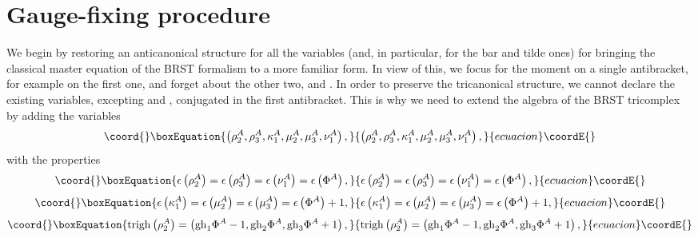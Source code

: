 \documentclass[a4paper,12pt]{article}
\begin{document}
\section{Gauge-fixing procedure}

We begin by restoring an anticanonical structure for all the variables (and,
in particular, for the bar and tilde ones) for bringing the classical master
equation of the BRST \coordHE{} formalism to a more familiar form. In view of
this, we focus for the moment on a single antibracket, for example on the
first one, and forget about the other two, \coordHE{} and \coordHE{}. In order to preserve the tricanonical structure, we
cannot declare the existing variables, excepting \coordHE{} and \coordHE{}, conjugated in the first antibracket. This is why we need to
extend the algebra of the BRST \coordHE{} tricomplex \coordHE{} by adding
the variables 
\begin{equation}\coord{}\boxEquation{
\left( \rho _{2}^{A},\rho _{3}^{A},\kappa _{1}^{A},\mu _{2}^{A},\mu
_{3}^{A},\nu _{1}^{A}\right) ,  \label{sp3.100a}
}{
\left( \rho _{2}^{A},\rho _{3}^{A},\kappa _{1}^{A},\mu _{2}^{A},\mu
_{3}^{A},\nu _{1}^{A}\right) ,  }{ecuacion}\coordE{}\end{equation}
with the properties 
\begin{equation}\coord{}\boxEquation{
\epsilon \left( \rho _{2}^{A}\right) =\epsilon \left( \rho _{3}^{A}\right)
=\epsilon \left( \nu _{1}^{A}\right) =\epsilon \left( \Phi ^{A}\right) ,
\label{sp3.100}
}{
\epsilon \left( \rho _{2}^{A}\right) =\epsilon \left( \rho _{3}^{A}\right)
=\epsilon \left( \nu _{1}^{A}\right) =\epsilon \left( \Phi ^{A}\right) ,
}{ecuacion}\coordE{}\end{equation}
\begin{equation}\coord{}\boxEquation{
\epsilon \left( \kappa _{1}^{A}\right) =\epsilon \left( \mu _{2}^{A}\right)
=\epsilon \left( \mu _{3}^{A}\right) =\epsilon \left( \Phi ^{A}\right) +1,
\label{sp3.101}
}{
\epsilon \left( \kappa _{1}^{A}\right) =\epsilon \left( \mu _{2}^{A}\right)
=\epsilon \left( \mu _{3}^{A}\right) =\epsilon \left( \Phi ^{A}\right) +1,
}{ecuacion}\coordE{}\end{equation}
\begin{equation}\coord{}\boxEquation{
\mathrm{trigh}\left( \rho _{2}^{A}\right) =\left( \mathrm{gh}_{1}\Phi ^{A}-1,
\mathrm{gh}_{2}\Phi ^{A},\mathrm{gh}_{3}\Phi ^{A}+1\right) ,  \label{sp3.102}
}{
\mathrm{trigh}\left( \rho _{2}^{A}\right) =\left( \mathrm{gh}_{1}\Phi ^{A}-1,
\mathrm{gh}_{2}\Phi ^{A},\mathrm{gh}_{3}\Phi ^{A}+1\right) ,  }{ecuacion}\coordE{}\end{equation}
\end{document}
